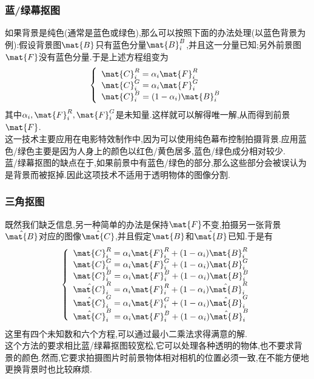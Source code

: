 \documentclass{ctexart}
\begin{document}
\subsubsection{蓝/绿幕抠图}
如果背景是纯色(通常是蓝色或绿色),那么可以按照下面的办法处理(以蓝色背景为例):假设背景图$\mat{B}$只有蓝色分量$\mat{B}_i^B$,并且这一分量已知;另外前景图$\mat{F}$没有蓝色分量.于是上述方程组变为
\[\left\{\begin{array}{l}
    \mat{C}_i^R=\alpha_i\mat{F}_i^R\\
    \mat{C}_i^G=\alpha_i\mat{F}_i^G\\
    \mat{C}_i^B=(1-\alpha_i)\mat{B}_i^B
\end{array}\right.\]
其中$\alpha_i,\mat{F}_i^R,\mat{F}_i^G$是未知量.这样就可以解得唯一解,从而得到前景$\mat{F}$.\\
\indent 这一技术主要应用在电影特效制作中,因为可以使用纯色幕布控制拍摄背景.应用蓝色/绿色主要是因为人身上的颜色以红色/黄色居多,蓝色/绿色成分相对较少.\\
\indent 蓝/绿幕抠图的缺点在于,如果前景中有蓝色/绿色的部分,那么这些部分会被误认为是背景而被抠掉.因此这项技术不适用于透明物体的图像分割.
\subsubsection{三角抠图}
既然我们缺乏信息,另一种简单的办法是保持$\mat{F}$不变,拍摄另一张背景$\hat{\mat{B}}$对应的图像$\hat{\mat{C}}$,并且假定$\mat{B}$和$\hat{\mat{B}}$已知.于是有
\[\left\{\begin{array}{l}
    \mat{C}_i^R=\alpha_i\mat{F}_i^R+(1-\alpha_i)\mat{B}_i^R\\
    \mat{C}_i^G=\alpha_i\mat{F}_i^G+(1-\alpha_i)\mat{B}_i^G\\
    \mat{C}_i^B=\alpha_i\mat{F}_i^B+(1-\alpha_i)\mat{B}_i^B\\
    \hat{\mat{C}}_i^R=\alpha_i\mat{F}_i^R+(1-\alpha_i)\hat{\mat{B}}_i^R\\
    \hat{\mat{C}}_i^G=\alpha_i\mat{F}_i^G+(1-\alpha_i)\hat{\mat{B}}_i^G\\
    \hat{\mat{C}}_i^B=\alpha_i\mat{F}_i^B+(1-\alpha_i)\hat{\mat{B}}_i^B
\end{array}\right.\]
这里有四个未知数和六个方程,可以通过最小二乘法求得满意的解.\\
\indent 这个方法的要求相比蓝/绿幕抠图较宽松,它可以处理各种透明的物体,也不要求背景的颜色.然而,它要求拍摄图片时前景物体相对相机的位置必须一致,在不能方便地更换背景时也比较麻烦.
\end{document}
